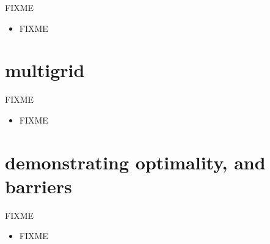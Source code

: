 \documentclass[hide notes,intlimits,usenames,dvipsnames]{beamer}
\begin{document}
\begin{frame}{FIXME}
\begin{itemize}
\item FIXME
\end{itemize}
\end{frame}


\section{multigrid}

\begin{frame}{FIXME}
\begin{itemize}
\item FIXME
\end{itemize}
\end{frame}


\section{demonstrating optimality, and barriers}

\begin{frame}{FIXME}
\begin{itemize}
\item FIXME
\end{itemize}
\end{frame}
\end{document}
